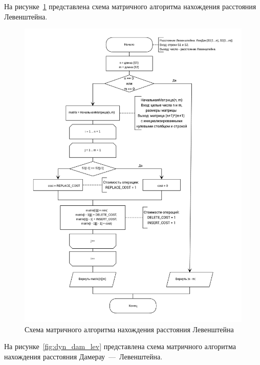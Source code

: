 На рисунке~\ref{fig:dyn_lev} представлена схема матричного алгоритма нахождения расстояния Левенштейна.

\begin{figure}[!htb]
\centering
\includegraphics[width=\textwidth]{img/levenshtein_dynamic.png}
\caption{Схема матричного алгоритма нахождения расстояния Левенштейна}
\label{fig:dyn_lev}
\end{figure}


На рисунке~\ref{fig:dyn_dam_lev} представлена схема матричного алгоритма нахождения расстояния Дамерау~---~Левенштейна.

